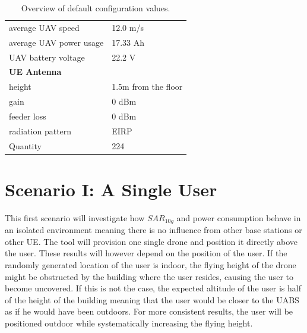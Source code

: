 \begin{table}[!htb]
\begin{tabular}[t]{ll}
        \hspace{3mm}  average UAV speed                   & 12.0 m/s \\
        \hspace{3mm}  average UAV power usage             & 17.33 Ah    \\
        \hspace{3mm}  UAV battery voltage                 & 22.2 V \\
        \hline
        \multicolumn{2}{l}{\textbf{\acs{UE} Antenna}} \\
        \hline 
        \hspace{3mm} height                     & 1.5m from the floor       \\ 
        \hspace{3mm} gain                      & 0 dBm   \\ 
        \hspace{3mm} feeder loss               & 0 dBm   \\ 
        \hspace{3mm} radiation pattern         & \acs{EIRP}  \\
        \hspace{3mm} Quantity                   & 224  \\
        \toprule
\end{tabular}
\caption{Overview of default configuration values.}
\label{table:defaultconf}
\end{table}

\section{Scenario I: A Single User}
\label{sec:scenarios_s1}

This first scenario will investigate how $SAR_{10g}$ and power consumption behave in an isolated environment meaning there is no influence 
from other base stations or other \gls{UE}. The tool will provision one single drone and position it directly above the user.
These results will however depend on the position of the user. If the randomly generated location of the user is indoor, 
the flying height of the drone might be obstructed by the building where the user resides, causing the user to become uncovered. If this is not the case,
the expected altitude of the user is half of the height of the building meaning that the user would be closer to the \gls{UABS} as 
if he would have been outdoors. For more consistent results, the user will be positioned outdoor while systematically 
increasing the flying height. 

